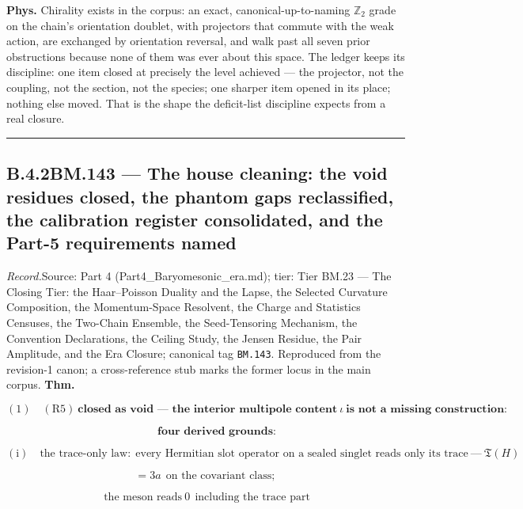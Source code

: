 \documentclass[11pt,openany]{report}
\theoremstyle{canonplain}
\theoremstyle{canondef}
\begin{document}
\textbf{Phys.} Chirality exists in the corpus: an exact, canonical-up-to-naming $\mathbb Z_2$ grade on the chain's orientation doublet, with projectors that commute with the weak action, are exchanged by orientation reversal, and walk past all seven prior obstructions because none of them was ever about this space. The ledger keeps its discipline: one item closed at precisely the level achieved — the projector, not the coupling, not the section, not the species; one sharper item opened in its place; nothing else moved. That is the shape the deficit-list discipline expects from a real closure.

\vspace{2pt}\noindent\rule{\textwidth}{0.4pt}\vspace{2pt}

\medskip
\subsection*{\texorpdfstring{B.4.2\quad BM.143 — The house cleaning: the void residues closed, the phantom gaps reclassified, the calibration register consolidated, and the Part-5 requirements named}{BM.143 B.4.2}}
\label{tag:BM-143}
{\small \textit{Record.}\quad Source: Part 4 (Part4\_Baryomesonic\_era.md); tier: Tier BM.23 — The Closing Tier: the Haar–Poisson Duality and the Lapse, the Selected Curvature Composition, the Momentum-Space Resolvent, the Charge and Statistics Censuses, the Two-Chain Ensemble, the Seed-Tensoring Mechanism, the Convention Declarations, the Ceiling Study, the Jensen Residue, the Pair Amplitude, and the Era Closure; canonical tag \texttt{BM.143}. Reproduced from the revision-1 canon; a cross-reference stub marks the former locus in the main corpus.}
\medskip
\textbf{Thm.}

\[
(1)\quad(\mathrm{R5})\ \textbf{closed as void — the interior multipole content}\ \iota\ \textbf{is not a missing construction:}
\]

\[
\qquad \textbf{four derived grounds:}
\]

\[
(\mathrm i)\quad\text{the trace-only law:}\ \ \text{every Hermitian slot operator on a sealed singlet reads only its trace}\ —\ \mathfrak T(H)
\]

\[
= 3a\ \ \text{on the covariant class};
\]

\[
\ \text{the meson reads}\ 0\ \ \text{including the trace part}
\]
\end{document}

